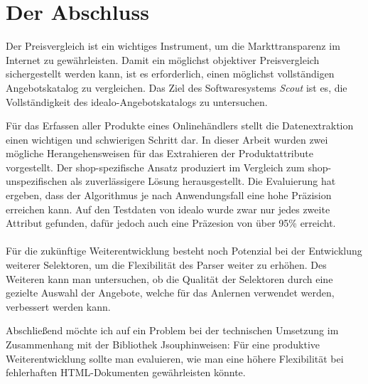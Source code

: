 \section{Der Abschluss}

Der Preisvergleich ist ein wichtiges Instrument, um die Markttransparenz im Internet zu gewährleisten.
Damit ein möglichst objektiver Preisvergleich sichergestellt werden kann, ist es erforderlich, einen möglichst
vollständigen Angebotskatalog zu vergleichen.
Das Ziel des Softwaresystems \textit{Scout} ist es, die Vollständigkeit des idealo-Angebotskatalogs zu untersuchen.

Für das Erfassen aller Produkte eines Onlinehändlers stellt die Datenextraktion einen wichtigen und schwierigen
Schritt dar.
In dieser Arbeit wurden zwei mögliche Herangehensweisen für das Extrahieren der Produktattribute vorgestellt.
Der shop-spezifische Ansatz produziert im Vergleich zum shop-unspezifischen als zuverlässigere Lösung herausgestellt.
Die Evaluierung hat ergeben, dass der Algorithmus je nach Anwendungsfall eine hohe Präzision erreichen kann.
Auf den Testdaten von idealo wurde zwar nur jedes zweite Attribut gefunden, dafür jedoch auch eine Präzesion von über
95\% erreicht.
\\
~\\
Für die zukünftige Weiterentwicklung besteht noch Potenzial bei der Entwicklung weiterer Selektoren, um die
Flexibilität des Parser weiter zu erhöhen.
Des Weiteren kann man untersuchen, ob die Qualität der Selektoren durch eine gezielte Auswahl der Angebote, welche
für das Anlernen verwendet werden, verbessert werden kann.

Abschließend möchte ich auf ein Problem bei der technischen Umsetzung im Zusammenhang mit der Bibliothek
Jsoup\footnotemark hinweisen: Für eine produktive Weiterentwicklung sollte man evaluieren, wie man eine höhere
Flexibilität bei fehlerhaften HTML-Dokumenten gewährleisten könnte.
